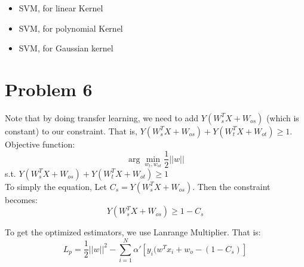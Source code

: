\documentclass{article}
\begin{document}
\begin{itemize}
\begin{scriptsize}
\begin{verbatim}
		   [3313] 4 0 7 7 2 8 0 5 6 9 5 2 2 9 2 9 2 3 0 4 1 5 2 0 1 4 0 3 9 6 7 1 2 3 6 7 6 5 8 5 6 2 2 3 6 6
		   [3359] 6 7 7 2 4 9 6 4 0 8 4 1 7 8 5 7 4 2 6 7 7 2 3 6 2 3 7 6 7 2 7 2 9 3 2 3 0 7 2 1 9 0 3 7 6 0
		   [3405] 8 1 5 2 9 5 3 9 8 5 2 9 2 5 1 6 8 3 2 8 9 7 0 2 2 0 0 8 3 5 7 0 9 9 7 9 1 4 2 2 5 9 0 2 4 6
		   [3451] 1 0 0 9 4 0 7 7 6 5 2 5 1 2 9 5 4 5 8 8 9 7 5 9 2 6 7 7 7 8 5 3 2 3 6 0 1 9 8 0 7 2 1 5 1 1
		   [3497] 4 0 7 7 4 9 5 5 1 4 4 3 3 0 2 7 7 1 4 0 3 5 6 0 8 4 0 7 5 6 5 7 3 0 4 1 5 7 3 2 6 6 1 7 1 2
		   [3543] 2 6 9 0 7 8 2 0 4 1 7 8 3 9 2 7 0 1 8 6 2 8 5 6 9 7 7 4 4 5 0 8 7 7 0 2 3 7 6 4 8 3 2 3 6 2
		   [3589] 9 3 7 8 5 6 4 9 1 3 0 3 4 3 0 2 7 9 0 7 7 3 5 5 3 1 2 3 1 7 7 8 4 0 6 7 4 0 0 5 1 7 6 1 6 6
		   [3635] 7 8 9 9 8 7 3 4 4 4 3 9 2 4 3 1 2 3 3 3 0 1 6 3 4 6 7 3 4 5 8 2 7 6 0 9 6 4 1 7 1 8 9 7 7 1
		   [3681] 5 4 4 8 1 4 1 6 6 0 3 5 7 2 7 5 4 1 2 0 1 9 0 2 6 4 8 9 3 3 0 3 5 9 4 3 0 3 7 7 0 3 3 3 1 2
		   [3727] 2 3 6 7 4 2 7 6 4 1 9 1 6 3 9 0 5 4 5 2 7
		\end{verbatim}
	\end{scriptsize}
	\item SVM, for linear Kernel\\
	
	\item SVM, for polynomial Kernel\\
	
	\item SVM, for Gaussian kernel \\
	
\end{itemize}
 
 
\section{Problem 6}
Note that by doing transfer learning, we need to add $Y(W_s^TX+W_{os})$ (which is constant) to our constraint. That is, $Y(W_s^TX+W_{os})+Y(W_t^TX+W_{ot}) \geq 1$. \\
Objective function: \[\arg \min_{w_t,w_{ot}} \dfrac{1}{2} ||w||\]
s.t. $Y(W_s^TX+W_{os})+Y(W_t^TX+W_{ot}) \geq 1$\\

To simply the equation, Let $ C_s=Y(W_s^TX+W_{os})$. Then the constraint becomes:
\[Y(W_s^TX+W_{os})\geq 1 -C_s\]

To get the optimized estimators, we use Lanrange Multiplier. That is: 
\begin{equation}
L_p= \dfrac{1}{2}||w||^2- \sum_{i=1}^N \alpha'[y_i(w^Tx_i+w_o-(1-C_s)]
\end{equation}
\end{document}
